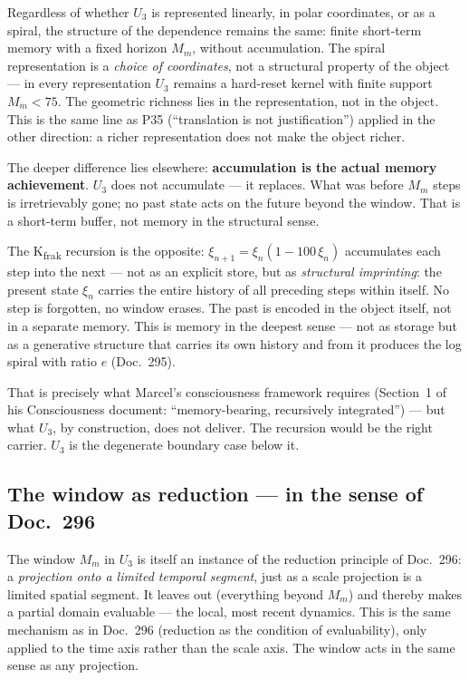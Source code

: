 Regardless of whether $U_3$ is represented linearly, in polar coordinates,
or as a spiral, the structure of the dependence remains the same: finite
short-term memory with a fixed horizon $M_m$, without accumulation. The
spiral representation is a \emph{choice of coordinates}, not a structural
property of the object --- in every representation $U_3$ remains a
hard-reset kernel with finite support $M_m < 75$. The geometric richness
lies in the representation, not in the object. This is the same line as
P35 (\enquote{translation is not justification}) applied in the other
direction: a richer representation does not make the object richer.

The deeper difference lies elsewhere: \textbf{accumulation is the actual
memory achievement}. $U_3$ does not accumulate --- it replaces. What was
before $M_m$ steps is irretrievably gone; no past state acts on the future
beyond the window. That is a short-term buffer, not memory in the
structural sense.

The K\textsubscript{frak} recursion is the opposite:
$\xi_{n+1} = \xi_n(1 - 100\,\xi_n)$ accumulates each step into the next
--- not as an explicit store, but as \emph{structural imprinting}: the
present state $\xi_n$ carries the entire history of all preceding steps
within itself. No step is forgotten, no window erases. The past is encoded
in the object itself, not in a separate memory. This is memory in the
deepest sense --- not as storage but as a generative structure that carries
its own history and from it produces the log spiral with ratio $e$
(Doc.~295).

That is precisely what Marcel's consciousness framework requires (Section~1
of his Consciousness document: \enquote{memory-bearing, recursively
integrated}) --- but what $U_3$, by construction, does not deliver. The
recursion would be the right carrier. $U_3$ is the degenerate boundary
case below it.

\subsection*{The window as reduction --- in the sense of Doc.~296}

The window $M_m$ in $U_3$ is itself an instance of the reduction principle
of Doc.~296: a \emph{projection onto a limited temporal segment}, just as a
scale projection is a limited spatial segment. It leaves out (everything
beyond $M_m$) and thereby makes a partial domain evaluable --- the local,
most recent dynamics. This is the same mechanism as in Doc.~296 (reduction
as the condition of evaluability), only applied to the time axis rather than
the scale axis. The window acts in the same sense as any projection.

